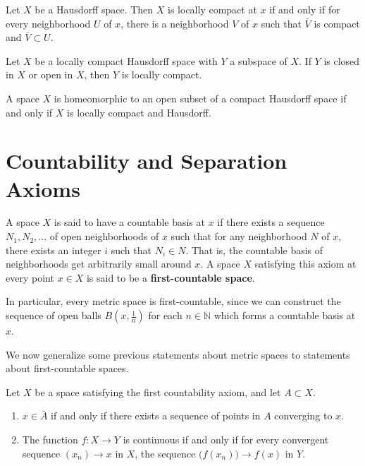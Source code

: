 \documentclass{article}
\begin{document}
    \begin{lemma}
    Let $X$ be a Hausdorff space. Then $X$ is locally compact at $x$ if and only if for every neighborhood $U$ of $x$, there is a neighborhood $V$ of $x$ such that $\bar{V}$ is compact and $\bar{V} \subset U$. 
    \end{lemma}

    \begin{corollary}
    Let $X$ be a locally compact Hausdorff space with $Y$ a subspace of $X$. If $Y$ is closed in $X$ or open in $X$, then $Y$ is locally compact. 
    \end{corollary}

    \begin{corollary}
    A space $X$ is homeomorphic to an open subset of a compact Hausdorff space if and only if $X$ is locally compact and Hausdorff. 
    \end{corollary}

\section{Countability and Separation Axioms}

    \begin{definition}
    A space $X$ is said to have a countable basis at $x$ if there exists a sequence $N_1, N_2, ...$ of open neighborhoods of $x$ such that for any neighborhood $N$ of $x$, there exists an integer $i$ such that $N_i \in N$. That is, the countable basis of neighborhoods get arbitrarily small around $x$. A space $X$ satisfying this axiom at every point $x \in X$ is said to be a \textbf{first-countable space}. 
    \end{definition}

    In particular, every metric space is first-countable, since we can construct the sequence of open balls $B (x, \frac{1}{n})$ for each $n \in \mathbb{N}$ which forms a countable basis at $x$. 

    We now generalize some previous statements about metric spaces to statements about first-countable spaces. 

    \begin{theorem}
    Let $X$ be a space satisfying the first countability axiom, and let $A \subset X$. 
    \begin{enumerate}
        \item $x \in \bar{A}$ if and only if there exists a sequence of points in $A$ converging to $x$. 
        \item The function $f: X \longrightarrow Y$ is continuous if and only if for every convergent sequence $(x_n) \rightarrow x$ in $X$, the sequence $\big( f(x_n)\big) \rightarrow f(x)$ in $Y$. 
    \end{enumerate}
    \end{theorem}
\end{document}
